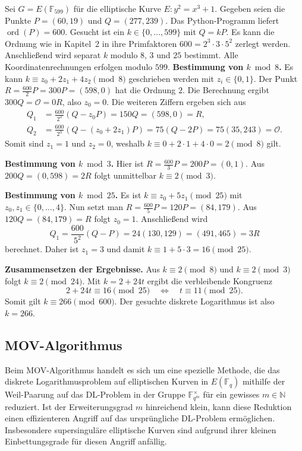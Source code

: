 \begin{beispiel}
    Sei $G=E(\mathbb{F}_{599})$ für die elliptische Kurve $E\colon y^2=x^3+1$. Gegeben seien die Punkte $P=(60,19)$ und $Q=(277,239)$. Das Python-Programm liefert $\operatorname{ord}(P)=600$. Gesucht ist ein $k\in\{0,\dots,599\}$ mit $Q=kP$. Es kann die Ordnung wie in Kapitel~2 in ihre Primfaktoren $600=2^3\cdot3\cdot5^2$ zerlegt werden. Anschließend wird separat $k$ modulo $8$, $3$ und $25$ bestimmt. Alle Koordinatenrechnungen erfolgen modulo $599$.
    \smallskip
    \noindent\textbf{Bestimmung von $k\bmod 8$.}
    Es kann $k\equiv z_0+2z_1+4z_2\pmod 8$ geschrieben werden
    mit $z_i\in\{0,1\}$. Der Punkt $R=\frac{600}{2}P=300P=(598,0)$ hat die Ordnung $2$. Die Berechnung ergibt $300Q=\mathcal{O}=0R$, also $z_0=0$.
    Die weiteren Ziffern ergeben sich aus
    \[
        \begin{aligned}
            Q_1 & =\frac{600}{2^2}(Q-z_0P)
            =150Q=(598,0)=R,                      \\
            Q_2 & =\frac{600}{2^3}(Q-(z_0+2z_1)P)
            =75(Q-2P)=75(35,243)=\mathcal{O}.
        \end{aligned}
    \]
    Somit sind $z_1=1$ und $z_2=0$, weshalb
    $k\equiv 0+2\cdot1+4\cdot0=2\pmod 8$ gilt.

    \smallskip
    \noindent\textbf{Bestimmung von $k\bmod 3$.}
    Hier ist $R=\frac{600}{3}P=200P=(0,1)$.
    Aus $200Q=(0,598)=2R$ folgt unmittelbar
    $k\equiv2\pmod 3$.

    \smallskip
    \noindent\textbf{Bestimmung von $k\bmod 25$.}
    Es ist $k\equiv z_0+5z_1\pmod{25}$
    mit $z_0,z_1\in\{0,\dots,4\}$. Nun setzt man
    $R=\frac{600}{5}P=120P=(84,179)$.
    Aus $120Q=(84,179)=R$ folgt $z_0=1$.
    Anschließend wird
    \[
        Q_1=\frac{600}{5^2}(Q-P)
        =24(130,129)=(491,465)=3R
    \]
    berechnet. Daher ist $z_1=3$ und damit $k\equiv1+5\cdot3=16\pmod{25}$.

    \smallskip
    \noindent\textbf{Zusammensetzen der Ergebnisse.}
    Aus $k\equiv2\pmod 8$ und $k\equiv2\pmod 3$
    folgt $k\equiv2\pmod{24}$.
    Mit $k=2+24t$ ergibt die verbleibende Kongruenz
    \[
        2+24t\equiv16\pmod{25}
        \quad\Longleftrightarrow\quad
        t\equiv11\pmod{25}.
    \]
    Somit gilt $k\equiv266\pmod{600}$.
    Der gesuchte diskrete Logarithmus ist also $k=266$.
\end{beispiel}

\subsection{MOV-Algorithmus}
Beim MOV-Algorithmus handelt es sich um eine spezielle Methode, die das diskrete Logarithmusproblem auf elliptischen Kurven in  $E(\mathbb{F}_q)$  mithilfe der Weil-Paarung auf das DL-Problem in der Gruppe $\mathbb{F}_{q^m}^\times$ für ein gewisses $m\in\mathbb{N}$ reduziert. Ist der Erweiterungsgrad $m$ hinreichend klein, kann diese Reduktion einen effizienteren Angriff auf das ursprüngliche DL-Problem ermöglichen. Insbesondere supersinguläre elliptische Kurven sind aufgrund ihrer kleinen Einbettungsgrade für diesen Angriff anfällig.

